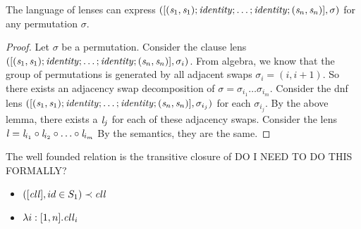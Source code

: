 \begin{lemma}
\label{lem:perm-exp}
The language of lenses can express $([(\mathit{s}_1,\mathit{s}_1) ; \mathit{identity} ; \ldots ; \mathit{identity} ; (\mathit{s}_n,\mathit{s}_n)], \sigma)$
for any permutation $\sigma$.
\begin{proof}
Let $\sigma$ be a permutation.
Consider the clause lens $([(\mathit{s}_1,\mathit{s}_1) ; \mathit{identity} ; \ldots ; \mathit{identity} ; (\mathit{s}_n,\mathit{s}_n)], \sigma_{i})$.
From algebra, we know that the group of permutations is generated by all
adjacent swaps $\sigma_i = (i,i+1)$.
So there exists an adjacency swap decomposition of $\sigma = \sigma_{i_1}\ldots\sigma_{i_m}$.
Consider the dnf lens $([(\mathit{s}_1,\mathit{s}_1) ; \mathit{identity} ; \ldots ; \mathit{identity} ; (\mathit{s}_n,\mathit{s}_n)], \sigma_{i_j})$ for each $\sigma_{i_j}$.
By the above lemma, there exists a $\mathit{l}_j$ for each of these adjacency swaps.
Consider the lens $\mathit{l} = \mathit{l}_{i_1} \circ \mathit{l}_{i_2} \circ \ldots  \circ \mathit{l}_{i_m}$
By the semantics, they are the same.

\end{proof}
\end{lemma}

\begin{definition}
The well founded relation is the transitive closure of
DO I NEED TO DO THIS FORMALLY?
\begin{itemize}
\item $([\mathit{cll}],id \in S_1) \prec \mathit{cll}$
\item $\lambda i:[1,n].\mathit{cll}_i$
\end{itemize}
\end{definition}

